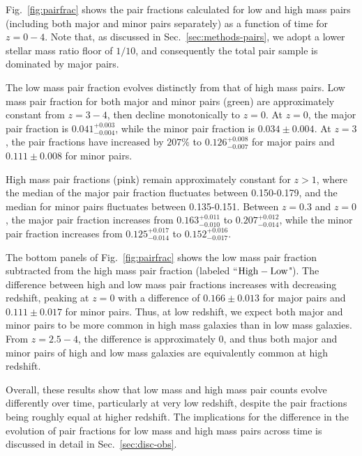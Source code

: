 \documentclass[twocolumn]{aastex631}
\begin{document}
    Fig.~\ref{fig:pairfrac} shows the pair fractions calculated for low and high mass pairs (including both major and minor pairs separately) as a function of time for $z=0-4$. 
    Note that, as discussed in Sec.~\ref{sec:methods-pairs}, we adopt a lower stellar mass ratio floor of $1/10$, and consequently the total pair sample is dominated by major pairs. 
    
    The low mass pair fraction evolves distinctly from that of high mass pairs.
    Low mass pair fraction for both major and minor pairs (green) are approximately constant from $z=3-4$, then decline monotonically to $z=0$. At $z=0$, the major pair fraction is $0.041^{+0.003}_{-0.004}$, while the minor pair fraction is $0.034\pm0.004$.
    At $z=3$, the pair fractions have increased by $207\%$ to $0.126^{+0.008}_{-0.007}$ for major pairs and $0.111\pm0.008$ for minor pairs. 

    High mass pair fractions (pink) remain approximately constant for $z>1$, where the median of the major pair fraction fluctuates between 0.150-0.179, and the median for minor pairs fluctuates between 0.135-0.151.
    Between $z=0.3$ and $z=0$, the major pair fraction increases from $0.163^{+0.011}_{-0.010}$ to $0.207^{+0.012}_{-0.014}$, while the minor pair fraction increases from $0.125^{+0.017}_{-0.014}$ to $0.152^{+0.016}_{-0.017}$.
    
    The bottom panels of Fig.~\ref{fig:pairfrac} shows the low mass pair fraction subtracted from the high mass pair fraction (labeled ``$\rm High-Low$").
    The difference between high and low mass pair fractions increases with decreasing redshift, peaking at $z=0$ with a difference of $0.166\pm0.013$ for major pairs and $0.111\pm0.017$ for minor pairs. 
    Thus, at low redshift, we expect both major and minor pairs to be more common in high mass galaxies than in low mass galaxies. 
    From $z=2.5-4$, the difference is approximately 0, and thus both major and minor pairs of high and low mass galaxies are equivalently common at high redshift. 
    
    Overall, these results show that low mass and high mass pair counts evolve differently over time, particularly at very low redshift, despite the pair fractions being roughly equal at higher redshift. 
    The implications for the difference in the evolution of pair fractions for low mass and high mass pairs across time is discussed in detail in Sec.~\ref{sec:disc-obs}.
    
\end{document}

